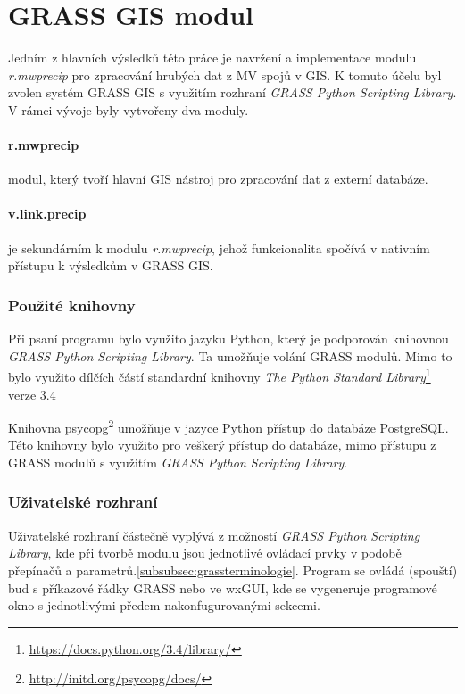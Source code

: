 \documentclass[a4paper,12pt,oneside]{report}
\begin{document}
\section{GRASS GIS modul}
Jedním z hlavních výsledků této práce je navržení a implementace modulu \textit{r.mwprecip} pro zpracování hrubých dat z MV spojů v GIS. K tomuto účelu byl zvolen systém GRASS GIS s využitím rozhraní \textit{GRASS Python Scripting Library}. V rámci vývoje byly vytvořeny dva moduly.

\paragraph*{r.mwprecip}  modul, který tvoří hlavní GIS nástroj pro zpracování dat z externí databáze.

\paragraph*{v.link.precip} je sekundárním  k modulu  \textit{r.mwprecip}, jehož funkcionalita spočívá v nativním přístupu k výsledkům   v GRASS GIS.  

\subsubsection{Použité knihovny}
Při psaní programu bylo využito jazyku Python, který je podporován knihovnou  \textit{GRASS Python Scripting Library}\cite{spygrass}. Ta umožňuje  volání GRASS modulů. Mimo to bylo využito dílčích částí standardní knihovny \textit{The Python Standard Library}\footnote{\url{https://docs.python.org/3.4/library/}} verze 3.4

Knihovna psycopg\footnote{\url{http://initd.org/psycopg/docs/}} umožňuje v jazyce Python přístup do databáze PostgreSQL. Této knihovny bylo využito pro veškerý přístup do databáze, mimo přístupu z GRASS modulů s využitím \textit{GRASS Python Scripting Library}.

\subsubsection{Uživatelské rozhraní}
Uživatelské rozhraní částečně vyplývá z možností \textit{GRASS Python Scripting Library}, kde při tvorbě modulu jsou jednotlivé ovládací prvky v podobě přepínačů a parametrů.\ref{subsubsec:grassterminologie}. Program se ovládá (spouští) bud s příkazové řádky GRASS nebo ve wxGUI, kde se vygeneruje programové okno s jednotlivými předem nakonfugurovanými sekcemi. 
\end{document}
